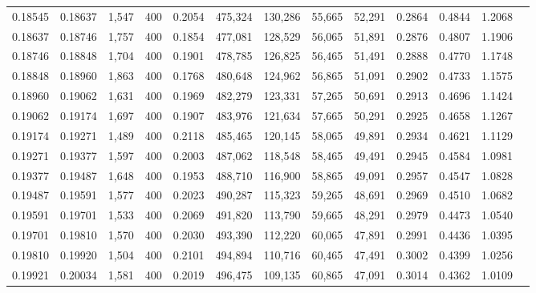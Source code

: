 \begin{tabular}{rrrrrrrrrrrrr}
0.18545 & 0.18637 &  1,547 & 400 &                                     0.2054 & 475,324 & 130,286 &  55,665 &  52,291 & 0.2864 & 0.4844 & 1.2068 \\
0.18637 & 0.18746 &  1,757 & 400 &                                     0.1854 & 477,081 & 128,529 &  56,065 &  51,891 & 0.2876 & 0.4807 & 1.1906 \\
0.18746 & 0.18848 &  1,704 & 400 &                                     0.1901 & 478,785 & 126,825 &  56,465 &  51,491 & 0.2888 & 0.4770 & 1.1748 \\
0.18848 & 0.18960 &  1,863 & 400 &                                     0.1768 & 480,648 & 124,962 &  56,865 &  51,091 & 0.2902 & 0.4733 & 1.1575 \\
0.18960 & 0.19062 &  1,631 & 400 &                                     0.1969 & 482,279 & 123,331 &  57,265 &  50,691 & 0.2913 & 0.4696 & 1.1424 \\
0.19062 & 0.19174 &  1,697 & 400 &                                     0.1907 & 483,976 & 121,634 &  57,665 &  50,291 & 0.2925 & 0.4658 & 1.1267 \\
0.19174 & 0.19271 &  1,489 & 400 &                                     0.2118 & 485,465 & 120,145 &  58,065 &  49,891 & 0.2934 & 0.4621 & 1.1129 \\
0.19271 & 0.19377 &  1,597 & 400 &                                     0.2003 & 487,062 & 118,548 &  58,465 &  49,491 & 0.2945 & 0.4584 & 1.0981 \\
0.19377 & 0.19487 &  1,648 & 400 &                                     0.1953 & 488,710 & 116,900 &  58,865 &  49,091 & 0.2957 & 0.4547 & 1.0828 \\
0.19487 & 0.19591 &  1,577 & 400 &                                     0.2023 & 490,287 & 115,323 &  59,265 &  48,691 & 0.2969 & 0.4510 & 1.0682 \\
0.19591 & 0.19701 &  1,533 & 400 &                                     0.2069 & 491,820 & 113,790 &  59,665 &  48,291 & 0.2979 & 0.4473 & 1.0540 \\
0.19701 & 0.19810 &  1,570 & 400 &                                     0.2030 & 493,390 & 112,220 &  60,065 &  47,891 & 0.2991 & 0.4436 & 1.0395 \\
0.19810 & 0.19920 &  1,504 & 400 &                                     0.2101 & 494,894 & 110,716 &  60,465 &  47,491 & 0.3002 & 0.4399 & 1.0256 \\
0.19921 & 0.20034 &  1,581 & 400 &                                     0.2019 & 496,475 & 109,135 &  60,865 &  47,091 & 0.3014 & 0.4362 & 1.0109 \\

\end{tabular}
